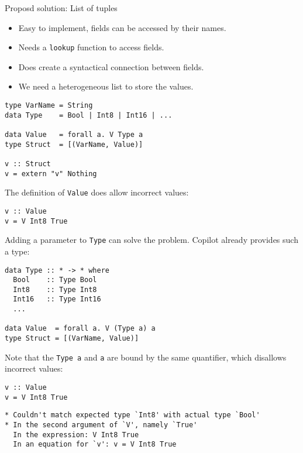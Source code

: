 \documentclass{beamer}
\begin{document}
\begin{frame}[fragile]{Proposd solution: List of tuples}
  \begin{itemize}
    \item Easy to implement, fields can be accessed by their names.
    \item Needs a \texttt{lookup} function to access fields.
    \item Does create a syntactical connection between fields.
    \item We need a heterogeneous list to store the values.
  \end{itemize}
\begin{lstlisting}
type VarName = String
data Type    = Bool | Int8 | Int16 | ...

data Value   = forall a. V Type a
type Struct  = [(VarName, Value)]

v :: Struct
v = extern "v" Nothing
\end{lstlisting}
\end{frame}

\begin{frame}[fragile]
  The definition of \texttt{Value} does allow incorrect values:
\begin{lstlisting}
v :: Value
v = V Int8 True
\end{lstlisting}
  Adding a parameter to \texttt{Type} can solve the problem. Copilot already
  provides such a type:
\begin{lstlisting}
data Type :: * -> * where
  Bool    :: Type Bool
  Int8    :: Type Int8
  Int16   :: Type Int16
  ...

data Value  = forall a. V (Type a) a
type Struct = [(VarName, Value)]
\end{lstlisting}
\end{frame}

\begin{frame}[fragile]
Note that the \texttt{Type a} and \texttt{a} are bound by the same
quantifier, which disallows incorrect values:
\begin{lstlisting}
v :: Value
v = V Int8 True
\end{lstlisting}

\begin{lstlisting}[basicstyle=\scriptsize,language={}]
* Couldn't match expected type `Int8' with actual type `Bool'
* In the second argument of `V', namely `True'
  In the expression: V Int8 True
  In an equation for `v': v = V Int8 True
\end{lstlisting}
\end{frame}
\end{document}
